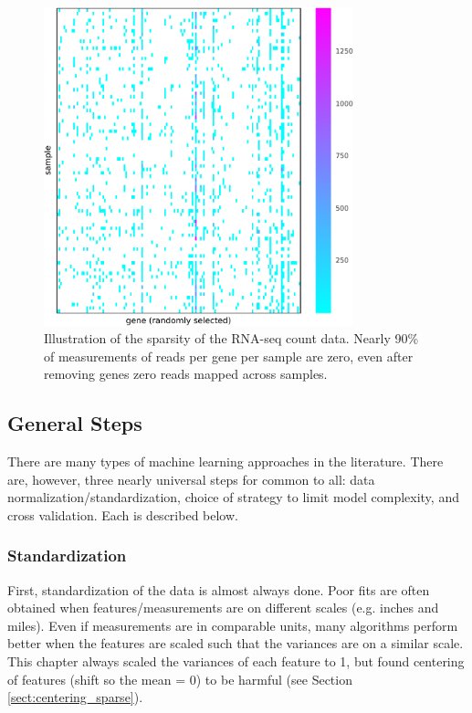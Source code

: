 \begin{figure}[H]
\centering
    \includegraphics[width=0.8\textwidth]{./tex/chapter3/figures/20170403_sparsity_illustration--754836_nonzero_features.pdf}
    \begin{singlespace}
    \caption[Illustration of the sparsity of the RNA-seq count data]{
        Illustration of the sparsity of the RNA-seq count data.
        Nearly 90\% of measurements of reads per gene per sample are zero, even after removing genes zero reads mapped across samples.
        }
    \label{fig:sparse_RNA-seq}
    \end{singlespace}
\end{figure}


\subsection{General Steps}

There are many types of machine learning approaches in the literature.
There are, however, three nearly universal steps for common to all: data normalization/standardization, choice of strategy to limit model complexity, and cross validation.
Each is described below.

\subsubsection{Standardization}
First, standardization of the data is almost always done.
Poor fits are often obtained when features/measurements are on different scales (e.g. inches and miles).
Even if measurements are in comparable units, many algorithms perform better when the features are scaled such that the variances are on a similar scale.
This chapter always scaled the variances of each feature to 1, but found centering of features (shift so the mean = 0) to be harmful (see Section \ref{sect:centering_sparse}).

